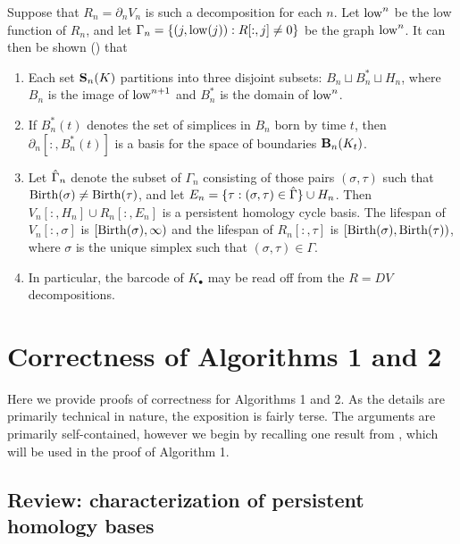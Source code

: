 \documentclass[utf8]{frontiers_suppmat} %
\begin{document}
Suppose that $R_n = \partial_n V_n$ is such a decomposition for each $n$.   Let $\mathrm{low}^n$ be the low function of $R_n$, and let $\Gamma_n = \{(j, \mathrm{low}(j)) : R[:,j] \neq 0\}$ be the graph $\mathrm{low}^n$.  It can then be shown (\cite{cohen2006vines, SMVDualities11}) that
    \begin{enumerate}
        \item Each set $\mathbf{S}_n(K)$ partitions into three disjoint subsets: $B_n \sqcup B^*_n \sqcup H_n$, where $B_n$ is the image of $\mathrm{low}^{n+1}$ and $B^*_n$ is the domain of $\mathrm{low}^n$.
        \item If $B_n^*(t)$ denotes the set of simplices in $B_n$ born by time $t$, then $\partial_n[:, B^*_n(t)]$ is a basis for the space of boundaries $\mathbf{B}_n(K_t)$.
        \item Let ${\hat{\Gamma}}_n$ denote the subset of $\Gamma_n$ consisting of those pairs $(\sigma, \tau)$ such that $\mathrm{Birth}(\sigma) \neq \mathrm{Birth}(\tau)$, and let $E_n = \{ \tau : (\sigma, \tau) \in {\hat{\Gamma}} \} \cup H_n$.  Then $V_n[:,H_n] \cup R_n[:,E_n] $ is a persistent homology cycle basis.  The lifespan of $V_n[:, \sigma]$ is $[\mathrm{Birth}(\sigma), \infty)$ and the lifespan of $R_n[:, \tau]$ is $[\mathrm{Birth}(\sigma), \mathrm{Birth}(\tau))$, where $\sigma$ is the unique simplex such that $(\sigma, \tau) \in \Gamma$.  
        \item In particular, the barcode of $K_\bullet$ may be read off from the $R = DV$ decompositions.
    \end{enumerate}
    

\section{Correctness of Algorithms 1 and 2}

Here we provide proofs of correctness for Algorithms 1 and 2.  As the details are primarily technical in nature, the exposition is fairly terse.  The arguments are primarily self-contained, however we begin by recalling one result from \cite{eirene}, which will be used in the proof of Algorithm 1.

\subsection{Review: characterization of persistent homology bases}

\newcommand{\ei}{{\epsilon_i}}
\newcommand{\eineg}{{\epsilon_{i-1}}}
\newcommand{\ej}{{\epsilon_j}}
\newcommand{\ejneg}{{\epsilon_{j-1}}}
\newcommand{\xij}{X^{i, j}}
\newcommand{\yij}{Y^{i, j}}
\newcommand{\Qij}{Q^{i,j}}
\newcommand{\qij}{q^{i, j}}
\newcommand{\eij}{E^{i,j}}
\end{document}
